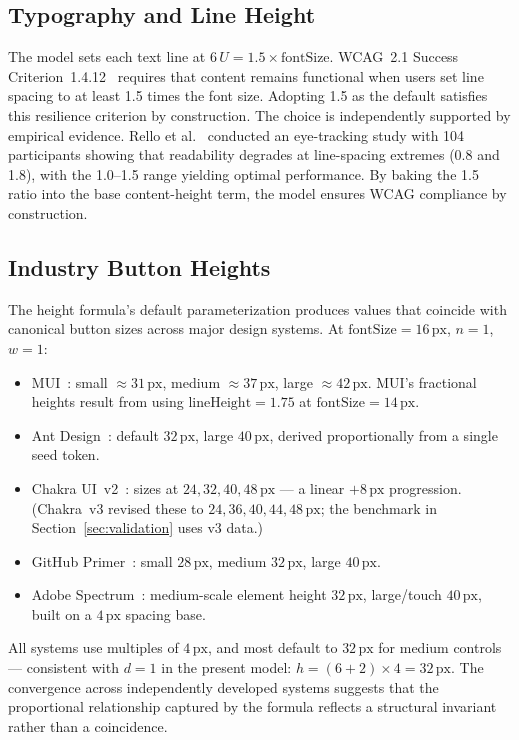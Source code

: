 \subsection{Typography and Line Height}

The model sets each text line at $6\,U = 1.5 \times \text{fontSize}$. WCAG~2.1 Success Criterion~1.4.12~\cite{wcag21text} requires that content remains functional when users set line spacing to at least 1.5 times the font size. Adopting 1.5 as the default satisfies this resilience criterion by construction. The choice is independently supported by empirical evidence. Rello et al.~\cite{rello2016} conducted an eye-tracking study with 104 participants showing that readability degrades at line-spacing extremes (0.8 and 1.8), with the 1.0--1.5 range yielding optimal performance. By baking the 1.5 ratio into the base content-height term, the model ensures WCAG compliance by construction.

\subsection{Industry Button Heights}

The height formula's default parameterization produces values that coincide with canonical button sizes across major design systems. At $\text{fontSize} = 16\,\text{px}$, $n = 1$, $w = 1$:

\begin{itemize}
  \item MUI~\cite{mui}: small $\approx 31\,\text{px}$, medium $\approx 37\,\text{px}$, large $\approx 42\,\text{px}$. MUI's fractional heights result from using $\text{lineHeight} = 1.75$ at $\text{fontSize} = 14\,\text{px}$.
  \item Ant Design~\cite{antdesign}: default $32\,\text{px}$, large $40\,\text{px}$, derived proportionally from a single seed token.
  \item Chakra UI~v2~\cite{chakra}: sizes at $24, 32, 40, 48\,\text{px}$ --- a linear $+8\,\text{px}$ progression. (Chakra~v3 revised these to $24, 36, 40, 44, 48\,\text{px}$; the benchmark in Section~\ref{sec:validation} uses v3 data.)
  \item GitHub Primer~\cite{primer}: small $28\,\text{px}$, medium $32\,\text{px}$, large $40\,\text{px}$.
  \item Adobe Spectrum~\cite{spectrum}: medium-scale element height $32\,\text{px}$, large/touch $40\,\text{px}$, built on a $4\,\text{px}$ spacing base.
\end{itemize}

All systems use multiples of $4\,\text{px}$, and most default to $32\,\text{px}$ for medium controls --- consistent with $d = 1$ in the present model: $h = (6 + 2) \times 4 = 32\,\text{px}$. The convergence across independently developed systems suggests that the proportional relationship captured by the formula reflects a structural invariant rather than a coincidence.
